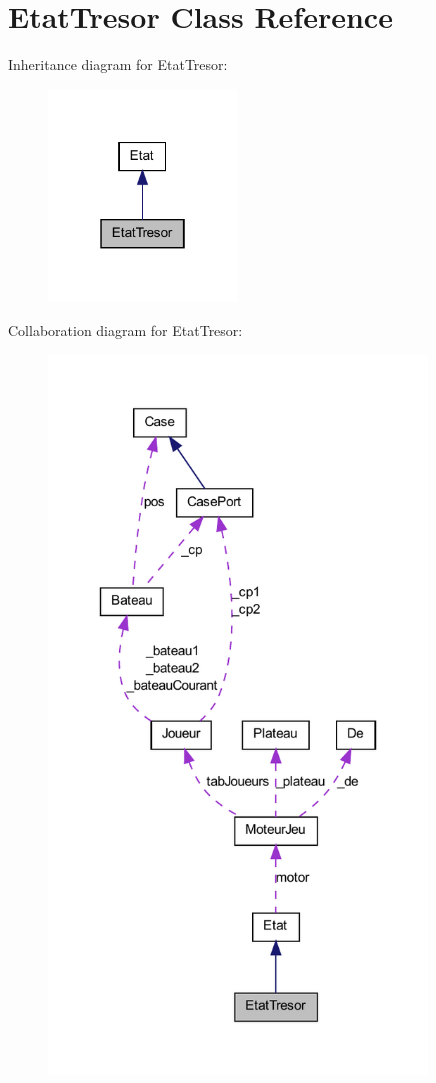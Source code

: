 \hypertarget{class_etat_tresor}{
\section{EtatTresor Class Reference}
\label{class_etat_tresor}
}


Inheritance diagram for EtatTresor:
\nopagebreak
\begin{figure}[H]
\begin{center}
\leavevmode
\includegraphics[width=142pt]{class_etat_tresor__inherit__graph}
\end{center}
\end{figure}


Collaboration diagram for EtatTresor:
\nopagebreak
\begin{figure}[H]
\begin{center}
\leavevmode
\includegraphics[width=285pt]{class_etat_tresor__coll__graph}
\end{center}
\end{figure}
